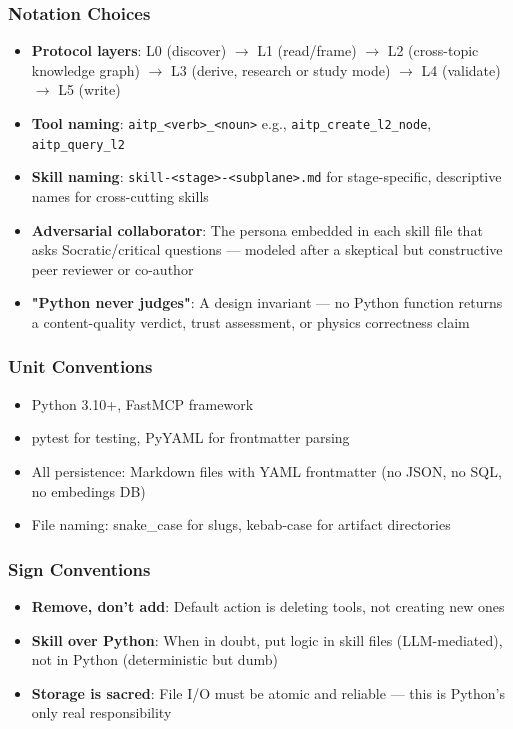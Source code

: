 \documentclass[11pt,a4paper]{article}
\begin{document}
\subsubsection*{Notation Choices}

\begin{itemize}
\item \textbf{Protocol layers}: L0 (discover) $\rightarrow$ L1 (read/frame) $\rightarrow$ L2 (cross-topic knowledge graph) $\rightarrow$ L3 (derive, research or study mode) $\rightarrow$ L4 (validate) $\rightarrow$ L5 (write)
\item \textbf{Tool naming}: \texttt{aitp\_<verb>\_<noun>} e.g., \texttt{aitp\_create\_l2\_node}, \texttt{aitp\_query\_l2}
\item \textbf{Skill naming}: \texttt{skill-<stage>-<subplane>.md} for stage-specific, descriptive names for cross-cutting skills
\item \textbf{Adversarial collaborator}: The persona embedded in each skill file that asks Socratic/critical questions — modeled after a skeptical but constructive peer reviewer or co-author
\item \textbf{"Python never judges"}: A design invariant — no Python function returns a content-quality verdict, trust assessment, or physics correctness claim
\end{itemize}

\subsubsection*{Unit Conventions}

\begin{itemize}
\item Python 3.10+, FastMCP framework
\item pytest for testing, PyYAML for frontmatter parsing
\item All persistence: Markdown files with YAML frontmatter (no JSON, no SQL, no embedings DB)
\item File naming: snake\_case for slugs, kebab-case for artifact directories
\end{itemize}

\subsubsection*{Sign Conventions}

\begin{itemize}
\item \textbf{Remove, don't add}: Default action is deleting tools, not creating new ones
\item \textbf{Skill over Python}: When in doubt, put logic in skill files (LLM-mediated), not in Python (deterministic but dumb)
\item \textbf{Storage is sacred}: File I/O must be atomic and reliable — this is Python's only real responsibility
\end{itemize}
\end{document}
